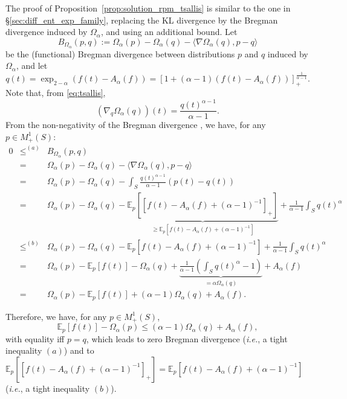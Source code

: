 \documentclass{article}
\begin{document}
The proof of Proposition~\ref{prop:solution_rpm_tsallis} is  similar to the one in \S\ref{sec:diff_ent_exp_family}, replacing the KL divergence by the Bregman divergence induced by $\Omega_\alpha$, and using an additional bound.
Let $$B_{\Omega_\alpha}(p, q) := \Omega_\alpha(p) - \Omega_\alpha(q) - \langle \nabla \Omega_\alpha(q), p-q \rangle$$ be the (functional) Bregman divergence between distributions $p$ and $q$ induced by $\Omega_\alpha$, and let $$q(t) = \exp_{2-\alpha}(f(t) - A_\alpha(f)) = [1 + (\alpha-1)(f(t) - A_\alpha(f))]_+^{\frac{1}{\alpha-1}}.$$ 
Note that, from \eqref{eq:tsallis}, $$\left(\nabla_q \Omega_{\alpha}(q)\right)(t) = \frac{q(t)^{\alpha-1}}{\alpha-1}.$$ 
From the non-negativity of the Bregman divergence \cite{bregman1967relaxation}, we have, for any $p \in M_+^1(S)$:
\begin{eqnarray}
0 &\le^{(a)}& B_{\Omega_\alpha}(p, q) \nonumber\\
&=& \Omega_\alpha(p) - \Omega_\alpha(q) - \langle \nabla \Omega_\alpha(q), p-q \rangle \nonumber\\
&=& \Omega_\alpha(p) - \Omega_\alpha(q) - \int_S \frac{q(t)^{\alpha-1}}{\alpha-1} (p(t) - q(t)) \nonumber\\
&=& \Omega_\alpha(p) - \Omega_\alpha(q) - \underbrace{\mathbb{E}_p[[f(t) - A_\alpha(f) + (\alpha-1)^{-1}]_+]}_{\ge \mathbb{E}_p[f(t) - A_\alpha(f) + (\alpha-1)^{-1}]} + \frac{1}{\alpha-1}\int_S q(t)^{\alpha} \nonumber\\
&\le^{(b)}& \Omega_\alpha(p) - \Omega_\alpha(q) - \mathbb{E}_p[f(t) - A_\alpha(f) + (\alpha-1)^{-1}] + \frac{1}{\alpha-1}\int_S q(t)^{\alpha} \nonumber\\
&=& \Omega_\alpha(p) - \mathbb{E}_p[f(t)]  - \Omega_\alpha(q) + \underbrace{\frac{1}{\alpha-1}\left(\int_S q(t)^{\alpha} - 1\right)}_{=\alpha \Omega_\alpha(q)} +A_\alpha(f) \nonumber\\
&=& \Omega_\alpha(p) - \mathbb{E}_p[f(t)]  + (\alpha-1)\Omega_\alpha(q) + A_\alpha(f).
\end{eqnarray}

Therefore, we have, for any $p \in M_+^1(S)$,
\begin{equation}\label{eq:variational_proof_tsallis}
\mathbb{E}_p[f(t)] - \Omega_\alpha(p) \le (\alpha-1)\Omega_\alpha(q) +A_\alpha(f),
\end{equation}
with equality iff $p = q$, which leads to zero Bregman divergence ({\it i.e.}, a tight inequality $(a)$) and to 
$\mathbb{E}_p[[f(t) - A_\alpha(f) + (\alpha-1)^{-1}]_+] = \mathbb{E}_p[f(t) - A_\alpha(f) + (\alpha-1)^{-1}]$ ({\it i.e.}, a tight inequality $(b)$).
\end{document}
